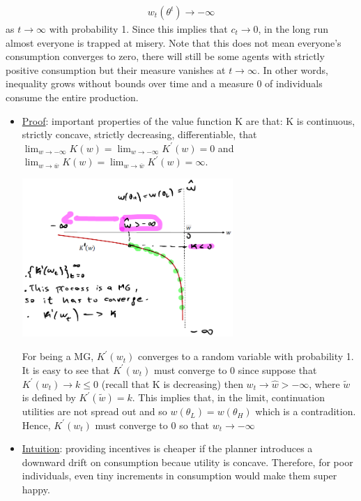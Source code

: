 \documentclass{article}
\begin{document}
\begin{itemize}
    \begin{gather*}
        w_{t}(\theta^{t}) \rightarrow - \infty
    \end{gather*}
    as $t \rightarrow \infty$ with probability 1. Since this implies that $c_{t} \rightarrow 0$, in the long run almost everyone is trapped at misery. Note that this does not mean everyone's consumption converges to zero, there will still be some agents with strictly positive consumption but their measure vanishes at $t \rightarrow \infty$. In other words, inequality grows without bounds over time and a measure 0 of individuals consume the entire production.
    \begin{itemize}
        \item  \underline{Proof}: important properties of the value function K are that: K is continuous, strictly concave, strictly decreasing, differentiable, that $\lim_{w \rightarrow - \infty} K(w) = \lim_{w \rightarrow -\infty}K^{'}(w) = 0$ and $\lim_{w \rightarrow \overline{w}} K(w) = \lim_{w \rightarrow \overline{w}}K^{'}(w) = \infty$.
        \newline
        \begin{center}
            \includegraphics[width=8cm, height=6cm]{pic25}
        \end{center}
        For being a MG, $K^{'}(w_{t})$ converges to a random variable with probability 1. It is easy to see that $K^{'}(w_{t})$ must converge to 0 since suppose that $K^{'}(w_{t}) \rightarrow k \leq 0$ (recall that K is decreasing) then $w_{t} \rightarrow \widehat{w} > - \infty$, where $\widetilde{w}$ is defined by $K^{'}(\widetilde{w}) = k$. This implies that, in the limit, continuation utilities are not spread out and so $w(\theta_{L}) = w(\theta_{H})$ which is a contradition. Hence, $K^{'}(w_{t})$ must converge to 0 so that $w_{t} \rightarrow - \infty$
        \item  \underline{Intuition}: providing incentives is cheaper if the planner introduces a downward drift on consumption becaue utility is concave. Therefore, for poor individuals, even tiny increments in consumption would make them super happy.

\end{itemize}
\end{itemize}
\end{document}
